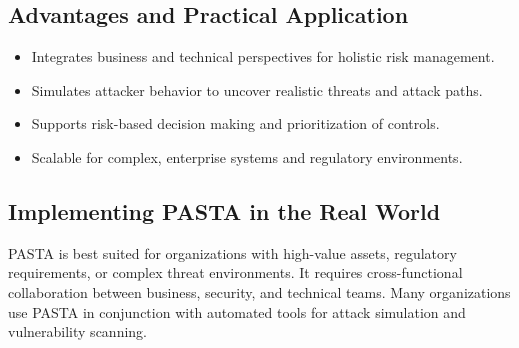\subsection*{Advantages and Practical Application}
\begin{itemize}
	\item Integrates business and technical perspectives for holistic risk management.
	\item Simulates attacker behavior to uncover realistic threats and attack paths.
	\item Supports risk-based decision making and prioritization of controls.\cite{uceda2015}
	\item Scalable for complex, enterprise systems and regulatory environments.
\end{itemize}

\subsection*{Implementing PASTA in the Real World}
PASTA is best suited for organizations with high-value assets, regulatory requirements, or complex threat environments. It requires cross-functional collaboration between business, security, and technical teams. Many organizations use PASTA in conjunction with automated tools for attack simulation and vulnerability scanning\cite{uceda2015,owasp}.
